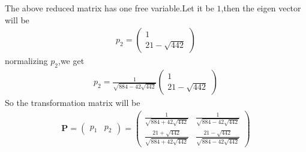 \documentclass[journal,12pt,twocolumn]{IEEEtran}
\newcommand{\myvec}[1]{\ensuremath{\begin{pmatrix}#1\end{pmatrix}}}
\numberwithin{equation}{subsection}
\let\vec\mathbf
\begin{document}
The above reduced matrix has one free variable.Let it be $1$,then the eigen vector will be
\begin{align}
    {p_2}=\myvec{1\\21-\sqrt{442}}
\end{align}
normalizing $p_2$,we get
\begin{align}
    p_2=\frac{1}{\sqrt{884-42\sqrt{442}}}\myvec{1\\21-\sqrt{442}}
\end{align}
So the transformation matrix will be 
\begin{align}
    \vec{P}=\myvec{p_1&p_2}=\myvec{\frac{1}{\sqrt{884+42\sqrt{442}}}&\frac{1}{\sqrt{884-42\sqrt{442}}}\\\frac{21+\sqrt{442}}{\sqrt{884+42\sqrt{442}}}&\frac{21-\sqrt{442}}{\sqrt{884-42\sqrt{442}}}}
\end{align}
\end{document}
